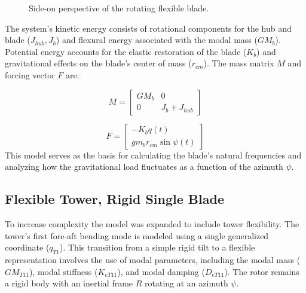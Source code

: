 \documentclass[onecolumn,draftcls]{IEEEtran}
\begin{document}
\begin{figure}[htbp]
    \caption{Side-on perspective of the rotating flexible blade.}
    \label{fig:flexible_blade_side_view}
\end{figure}

The system's kinetic energy consists of rotational components for the hub and blade ($J_{hub}, J_b$) and flexural energy associated with the modal mass ($GM_b$). Potential energy accounts for the elastic restoration of the blade ($K_b$) and gravitational effects on the blade's center of mass ($r_{cm}$). The mass matrix $M$ and forcing vector $F$ are:

\begin{equation}
    \label{eq:flex_blade_mass_matrix} M =
    \begin{bmatrix}
        GM_{b} & 0               \\
        0      & J_{b} + J_{hub}
    \end{bmatrix}
\end{equation}

\begin{equation}
    \label{eq:flex_blade_forcing_terms} F =
    \begin{bmatrix}
        -K_{b} q(t) \\
        g m_{b} r_{cm} \sin\psi(t)
    \end{bmatrix}
\end{equation}
This model serves as the basis for calculating the blade's natural frequencies and analyzing how the gravitational load fluctuates as a function of the azimuth $\psi$.

\subsection{Flexible Tower, Rigid Single Blade}
To increase complexity the model was expanded to include tower flexibility. The tower's first fore-aft bending mode is modeled using a single generalized coordinate ($q_{T1}$). This transition from a simple rigid tilt to a flexible representation involves the use of modal parameters, including the modal mass ($GM_{T11}$), modal stiffness ($K_{eT11}$), and modal damping ($D_{eT11}$). The rotor remains a rigid body with an inertial frame $R$ rotating at an azimuth $\psi$.
\end{document}
